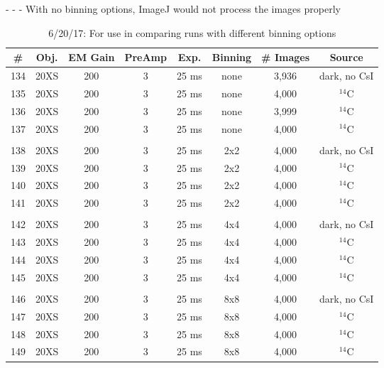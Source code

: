 \documentclass[12pt]{amsart}
\begin{document}
\begin{table}[!htbp]
	\centering
	\caption{6/20/17: For use in comparing runs with different binning options}

	- - - With no binning options, ImageJ would not process the images properly\
	\label{tab:table25}
	\hspace*{-1cm}
	\begin{tabular}{cccccccc}
	\toprule
	\# & Obj. & EM Gain & PreAmp & Exp. & Binning & \# Images & Source\\
	\midrule
	134 & 20XS & 200 & 3 & 25 ms & none & 3,936 & dark, no CsI\\
	135 & 20XS & 200 & 3 & 25 ms & none & 4,000 & $^{14}$C\\
	136 & 20XS & 200 & 3 & 25 ms & none & 3,999 & $^{14}$C\\
	137 & 20XS & 200 & 3 & 25 ms & none & 4,000 & $^{14}$C\\
	 & \\
	138 & 20XS & 200 & 3 & 25 ms & 2x2 & 4,000 & dark, no CsI\\
	139 & 20XS & 200 & 3 & 25 ms & 2x2 & 4,000 & $^{14}$C\\
	140 & 20XS & 200 & 3 & 25 ms & 2x2 & 4,000 & $^{14}$C\\
	141 & 20XS & 200 & 3 & 25 ms & 2x2 & 4,000 & $^{14}$C\\
	 & \\
	 142 & 20XS & 200 & 3 & 25 ms & 4x4 & 4,000 & dark, no CsI\\
	 143 & 20XS & 200 & 3 & 25 ms & 4x4 & 4,000 & $^{14}$C\\
	 144 & 20XS & 200 & 3 & 25 ms & 4x4 & 4,000 & $^{14}$C\\
	 145 & 20XS & 200 & 3 & 25 ms & 4x4 & 4,000 & $^{14}$C\\
	 & \\
	 146 & 20XS & 200 & 3 & 25 ms & 8x8 & 4,000 & dark, no CsI\\
	 147 & 20XS & 200 & 3 & 25 ms & 8x8 & 4,000 & $^{14}$C\\
	 148 & 20XS & 200 & 3 & 25 ms & 8x8 & 4,000 & $^{14}$C\\
	 149 & 20XS & 200 & 3 & 25 ms & 8x8 & 4,000 & $^{14}$C\\
	\bottomrule
	\end{tabular}
	\hspace*{-1cm}
\end{table}
\end{document}
